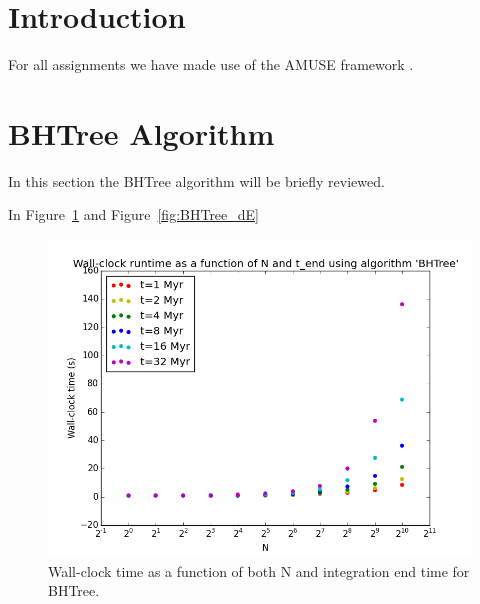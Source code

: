 \documentclass{aa}
\begin{document}
\section{Introduction}
For all assignments we have made use of the AMUSE framework \citep{2013CoPhC.183..456P, 2013A&A...557A..84P, 2009NewA...14..369P}.

\section{BHTree Algorithm}
  In this section the BHTree algorithm \citep{1986Natur.324..446B} will be briefly reviewed.

  In Figure~\ref{fig:BHTree_runtime} and Figure~\ref{fig:BHTree_dE}
  
   \begin{figure}
   \centering
   \includegraphics[width=\hsize]{../GravitationalDynamics/plots/CA_GD_TLRH_s1603221_SS_s1617451_BHTree_runtime.png}
      \caption{Wall-clock time as a function of both N and integration 
               end time for BHTree.
              }
         \label{fig:BHTree_runtime}
   \end{figure}
   
\end{document}
